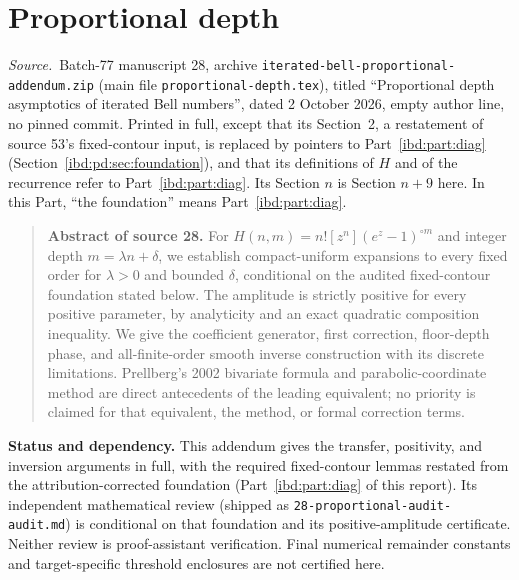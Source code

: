\documentclass[11pt,letterpaper]{article}
\theoremstyle{remark}\newtheorem{remark}[theorem]{Remark}
\newenvironment{partsource}{\par\medskip\noindent\begin{minipage}{\linewidth}\small\raggedright\textit{Source.}\ }{\end{minipage}\par\medskip}
\begin{document}
\part{Proportional depth}\label{ibd:part:pd}
\begin{partsource}Batch-77 manuscript 28, archive \texttt{iterated-bell-proportional-addendum.zip} (main file \texttt{proportional-depth.tex}), titled ``Proportional depth asymptotics of iterated Bell numbers'', dated 2 October 2026, empty author line, no pinned commit. Printed in full, except that its Section~2, a restatement of source 53's fixed-contour input, is replaced by pointers to Part~\ref{ibd:part:diag} (Section~\ref{ibd:pd:sec:foundation}), and that its definitions of $H$ and of the recurrence refer to Part~\ref{ibd:part:diag}. Its Section $n$ is Section $n+9$ here. In this Part, ``the foundation'' means Part~\ref{ibd:part:diag}.\end{partsource}
\begin{quote}\small\textbf{Abstract of source 28.} For $H(n,m)=n![z^n](e^z-1)^{\circ m}$ and integer depth $m=\lambda n+\delta$, we establish compact-uniform expansions to every fixed order for $\lambda>0$ and bounded $\delta$, conditional on the audited fixed-contour foundation stated below. The amplitude is strictly positive for every positive parameter, by analyticity and an exact quadratic composition inequality. We give the coefficient generator, first correction, floor-depth phase, and all-finite-order smooth inverse construction with its discrete limitations. Prellberg's 2002 bivariate formula and parabolic-coordinate method are direct antecedents of the leading equivalent; no priority is claimed for that equivalent, the method, or formal correction terms.\end{quote}
\noindent\textbf{Status and dependency.} This addendum gives the transfer, positivity, and inversion arguments in full, with the required fixed-contour lemmas restated from the attribution-corrected foundation (Part~\ref{ibd:part:diag} of this report). Its independent mathematical review (shipped as \texttt{28-proportional-audit-audit.md}) is conditional on that foundation and its positive-amplitude certificate. Neither review is proof-assistant verification. Final numerical remainder constants and target-specific threshold enclosures are not certified here.
\end{document}
